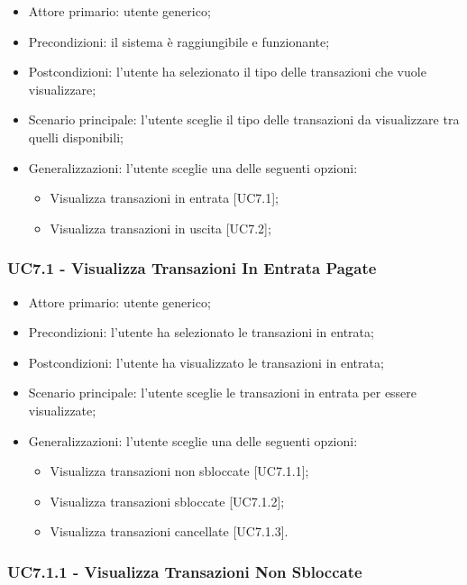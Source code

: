 \begin{itemize}
    \item Attore primario: utente generico;
    \item Precondizioni: il sistema è raggiungibile e funzionante;
    \item Postcondizioni: l'utente ha selezionato il tipo delle transazioni che vuole visualizzare;
    \item Scenario principale: l'utente sceglie il tipo delle transazioni da visualizzare tra quelli disponibili;
    \item Generalizzazioni: l'utente sceglie una delle seguenti opzioni:
          \begin{itemize}
              \item Visualizza transazioni in entrata [UC7.1];
              \item Visualizza transazioni in uscita [UC7.2];
          \end{itemize}
\end{itemize}

\subsubsection{UC7.1 - Visualizza Transazioni In Entrata Pagate}

\begin{itemize}
    \item Attore primario: utente generico;
    \item Precondizioni: l'utente ha selezionato le transazioni in entrata;
    \item Postcondizioni: l'utente ha visualizzato le transazioni in entrata;
    \item Scenario principale: l'utente sceglie le transazioni in entrata per essere visualizzate;
    \item Generalizzazioni: l'utente sceglie una delle seguenti opzioni:
          \begin{itemize}
              \item Visualizza transazioni non sbloccate [UC7.1.1];
              \item Visualizza transazioni sbloccate [UC7.1.2];
              \item Visualizza transazioni cancellate [UC7.1.3].
          \end{itemize}
\end{itemize}

\subsubsection{UC7.1.1 - Visualizza Transazioni Non Sbloccate}

